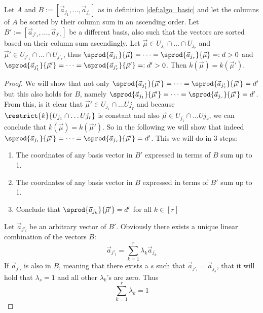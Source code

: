 \begin{lemma}
    Let $A$ and $B := [\vec a_{j_1}, \dots, \vec a_{j_r}]$ as in definition \ref{def:algo_basic} and let the columns of $A$ be sorted by their column sum in an ascending order. Let $B' := [\vec a_{j'_1}, \dots, \vec a_{j'_r}]$ be a different basis, also such that the vectors are sorted based on their column sum ascendingly. Let $\vec\mu \in U_{j_1} \cap \dots \cap U_{j_r}$ and $\vec\mu' \in U_{j'_1} \cap \dots \cap U_{j'_r}$, thus $\sprod{\vec a_{j_1}}{\vec\mu} = \dots = \sprod{\vec a_{j_r}}{\vec\mu} =: d > 0$ and $\sprod{\vec a_{j'_1}}{\vec\mu'} = \dots = \sprod{\vec a_{j'_r}}{\vec\mu'} =: d' > 0$. Then $k(\vec\mu) = k(\vec\mu')$.
\end{lemma}
\begin{proof}
    We will show that not only $\sprod{\vec a_{j'_1}}{\vec\mu'} = \dots = \sprod{\vec a_{j'_r}}{\vec\mu'} = d'$ but this also holds for $B$, namely $\sprod{\vec a_{j_1}}{\vec\mu'} = \dots = \sprod{\vec a_{j_r}}{\vec\mu'} = d'$. From this, is it clear that $\vec\mu' \in U_{j_1} \cap \dots U{j_r}$ and because $\restrict{k}{U_{j_1} \cap \dots U{j_r}}$ is constant and also $\vec\mu \in U_{j_1} \cap \dots U{j_r}$, we can conclude that $k(\vec\mu) = k(\vec\mu')$. So in the following we will show that indeed $\sprod{\vec a_{j_1}}{\vec\mu'} = \dots = \sprod{\vec a_{j_r}}{\vec\mu'} = d'$. This we will do in 3 steps:
    \begin{enumerate}
        \item The coordnates of any basis vector in $B'$ expressed in terms of $B$ sum up to 1.
        \item The coordnates of any basis vector in $B$ expressed in terms of $B'$ sum up to 1.
        \item Conclude that $\sprod{\vec a_{j_k}}{\vec\mu'} = d'$ for all $k \in [r]$
    \end{enumerate}

    Let $\vec a_{j'_l}$ be an arbitrary vector of $B'$. Obviously there exists a unique linear combination of the vectors $B$:
    $$\vec a_{j'_l} = \sum_{k=1}^{r}\lambda_k\vec a_{j_k}$$
    If $\vec a_{j'_l}$ is also in $B$, meaning that there exists a $s$ such that $\vec a_{j'_l} = \vec a_{j_s}$, that it will hold that $\lambda_s = 1$ and all other $\lambda_k$'s are zero. Thus
    $$\sum_{k=1}^{r}\lambda_k = 1$$


\end{proof}
